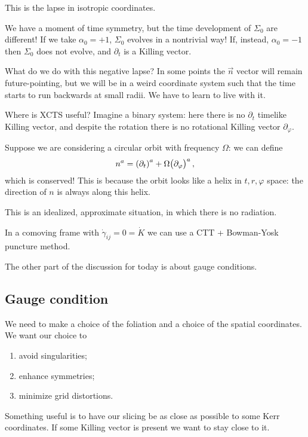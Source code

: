 \documentclass[main.tex]{subfiles}
\begin{document}
This is the lapse in isotropic coordinates. 

We have a moment of time symmetry, but the time development of \(\Sigma_0 \) are different! 
If we take \(\alpha_0 = +1\), \(\Sigma_0 \) evolves in a nontrivial way! 
If, instead, \(\alpha_0 = -1\) then \(\Sigma_0 \) does not evolve, and \(\partial_{t}\) is a Killing vector. 

What do we do with this negative lapse? In some points the \(\vec{n}\) vector will remain future-pointing, but we will be in a weird coordinate system such that the time starts to run backwards at small radii. 
We have to learn to live with it.

Where is XCTS useful? 
Imagine a binary system: here there is no \(\partial_{t}\) timelike Killing vector, and despite the rotation there is no rotational Killing vector \(\partial_{\varphi }\). 

Suppose we are considering a circular orbit with frequency \(\Omega \): 
we can define 
%
\begin{align}
n^a = \qty(\partial_{t})^{a} + \Omega \qty(\partial_{\varphi })^{a}
\,,
\end{align}
%
which is conserved! This is because the orbit looks like a helix in \(t, r, \varphi \) space: the direction of \(n\) is always along this helix. 

This is an idealized, approximate situation, in which there is no radiation.

In a comoving frame with \(\dot{\gamma}_{ij} = 0 = \dot{K}\) we can use a CTT + Bowman-Yosk puncture method.

The other part of the discussion for today is about gauge conditions. 

\subsection{Gauge condition}

We need to make a choice of the foliation and a choice of the spatial coordinates. 
We want our choice to 
\begin{enumerate}
    \item avoid singularities;
    \item enhance symmetries;
    \item minimize grid distortions.
\end{enumerate}

Something useful is to have our slicing be as close as possible to some Kerr coordinates. 
If some Killing vector is present we want to stay close to it.
\end{document}
